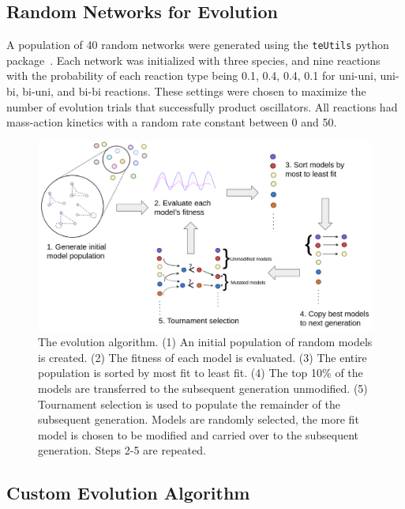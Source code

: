 \documentclass[12pt]{report}
\begin{document}
\subsection{Random Networks for Evolution}
A population of 40 random networks were generated using the {\tt teUtils} python package~\cite{SauroteUtils_2020}. Each network was initialized with three species, and nine reactions with the probability of each reaction type being 0.1, 0.4, 0.4, 0.1 for uni-uni, uni-bi, bi-uni, and bi-bi reactions. These settings were chosen to maximize the number of evolution trials that successfully product oscillators. All reactions had mass-action kinetics with a random rate constant between 0 and 50. 
\begin{figure}
\begin{center}
    \includegraphics[width=17cm]{images/algorithm.png}
    \caption[Overview of the evolution algorithm in Python]{The evolution algorithm. (1) An initial population of random models is created. (2) The fitness of each model is evaluated. (3) The entire population is sorted by most fit to least fit. (4) The top 10\% of the models are transferred to the subsequent generation unmodified. (5)  Tournament selection is used to populate the remainder of the subsequent generation. Models are randomly selected, the more fit model is chosen to be modified and carried over to the subsequent generation. Steps 2-5 are repeated. }
    \label{fig:algorithm}
    \end{center}
\end{figure}

\subsection{Custom Evolution Algorithm}
\end{document}
